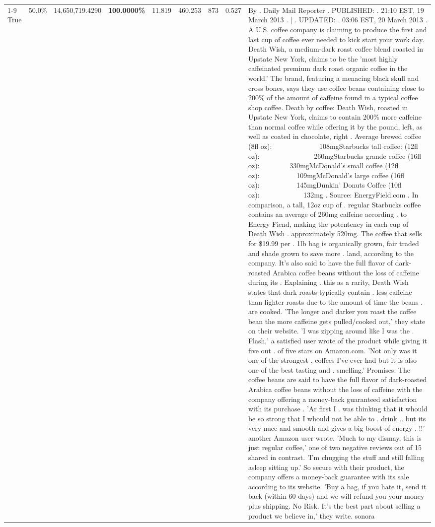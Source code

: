 \begin{table}[H]
{\begin{tabular}{lllrlllll}
\cline{1-9}
True & 50.0\% & 14,650,719.4290 & \bfseries \color{red} 100.0000\% & 11.819 & 460.253 & 873 & 0.527 & By . Daily Mail Reporter . PUBLISHED: . 21:10 EST, 19 March 2013 . | . UPDATED: . 03:06 EST, 20 March 2013 . A U.S. coffee company is claiming to produce the first and last cup of coffee ever needed to kick start your work day. Death Wish, a medium-dark roast coffee blend roasted in Upstate New York, claims to be the 'most highly caffeinated premium dark roast organic coffee in the world.' The brand, featuring a menacing black skull and cross bones, says they use coffee beans containing close to 200\% of the amount of caffeine found in a typical coffee shop coffee. Death by coffee: Death Wish, roasted in Upstate New York, claims to contain 200\% more caffeine than normal coffee while offering it by the pound, left, as well as coated in chocolate, right . Average brewed coffee (8fl oz):              108mgStarbucks tall coffee: (12fl oz):                260mgStarbucks grande coffee (16fl oz):         330mgMcDonald's small coffee (12fl oz):           109mgMcDonald's large coffee (16fl oz):           145mgDunkin' Donuts Coffee (10fl oz):             132mg . Source: EnergyField.com . In comparison, a tall, 12oz cup of . regular Starbucks coffee contains an average of 260mg caffeine according . to Energy Fiend, making the potentency in each cup of Death Wish . approximately 520mg. The coffee that sells for \$19.99 per . 1lb bag is organically grown, fair traded and shade grown to save more . land, according to the company. It's also said to have the full flavor of dark-roasted Arabica coffee beans without the loss of caffeine during its . Explaining . this as a rarity, Death Wish states that dark roasts typically contain . less caffeine than lighter roasts due to the amount of time the beans . are cooked. 'The longer and darker you roast the coffee bean the more caffeine gets pulled/cooked out,' they state on their website. 'I was zipping around like I was the . Flash,' a satisfied user wrote of the product while giving it five out . of five stars on Amazon.com. 'Not only was it one of the strongest . coffees I've ever had but it is also one of the best tasting and . smelling.’ Promises: The coffee beans are said to have the full flavor of dark-roasted Arabica coffee beans without the loss of caffeine with the company offering a money-back guaranteed satisfaction with its purchase . 'Ar first I . was thinking that it whould be so strong that I whould not be able to . drink .. but its very nuce and smooth and gives a big boost of energy . !!' another Amazon user wrote. 'Much to my dismay, this is just regular coffee,' one of two negative reviews out of 15 shared in contrast. 'I'm chugging the stuff and still falling asleep sitting up.' So secure with their product, the company offers a money-back guarantee with its sale according to its website. 'Buy a bag, if you hate it, send it back (within 60 days) and we will refund you your money plus shipping. No Risk. It’s the best part about selling a product we believe in,' they write. sonora \\

\end{tabular}}
\end{table}
